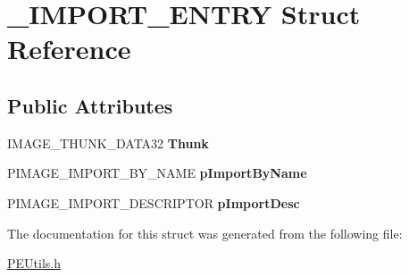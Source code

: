 \hypertarget{struct___i_m_p_o_r_t___e_n_t_r_y}{}\section{\+\_\+\+I\+M\+P\+O\+R\+T\+\_\+\+E\+N\+T\+RY Struct Reference}
\label{struct___i_m_p_o_r_t___e_n_t_r_y}
\subsection*{Public Attributes}
\begin{DoxyCompactItemize}
\item 
\mbox{\label{struct___i_m_p_o_r_t___e_n_t_r_y_a219d004675ee16acbfc0274eb23bfd66}} 
I\+M\+A\+G\+E\+\_\+\+T\+H\+U\+N\+K\+\_\+\+D\+A\+T\+A32 {\bfseries Thunk}
\item 
\mbox{\label{struct___i_m_p_o_r_t___e_n_t_r_y_a42517bf71f9160b5c47a35e0f5d288dc}} 
P\+I\+M\+A\+G\+E\+\_\+\+I\+M\+P\+O\+R\+T\+\_\+\+B\+Y\+\_\+\+N\+A\+ME {\bfseries p\+Import\+By\+Name}
\item 
\mbox{\label{struct___i_m_p_o_r_t___e_n_t_r_y_a3269f59ceb7fd46ec81d716ac736893b}} 
P\+I\+M\+A\+G\+E\+\_\+\+I\+M\+P\+O\+R\+T\+\_\+\+D\+E\+S\+C\+R\+I\+P\+T\+OR {\bfseries p\+Import\+Desc}
\end{DoxyCompactItemize}


The documentation for this struct was generated from the following file\+:\begin{DoxyCompactItemize}
\item 
\mbox{\hyperlink{_p_e_utils_8h}{P\+E\+Utils.\+h}}\end{DoxyCompactItemize}

